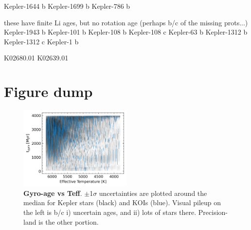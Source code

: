 \documentclass[11pt,twocolumn,tighten]{aastex63}
\begin{document}
Kepler-1644 b
Kepler-1699 b
 Kepler-786 b

these have finite Li ages, but no rotation age (perhaps b/c of the missing prots...)
Kepler-1943 b
 Kepler-101 b
 Kepler-108 b
 Kepler-108 c
  Kepler-63 b
Kepler-1312 b
Kepler-1312 c
   Kepler-1 b

K02680.01
K02639.01





\section{Figure dump}

\begin{figure}[!t]
  \begin{center}
    \leavevmode
    \includegraphics[width=0.5\textwidth]{gyroage_vs_teff_errs_showplanets_linear.png}
  \end{center}
  \vspace{-0.6cm}
  \caption{
    {\bf Gyro-age vs Teff}.
    $\pm$1$\sigma$ uncertainties are plotted around the median for Kepler stars (black) and KOIs (blue).
    Visual pileup on the left is b/c i) uncertain ages, and ii) lots of stars there.  Precision-land is the other portion.
    \label{fig:gyroage_vs_teff}
  }
\end{figure}

\clearpage
\listofchanges
\end{document}
